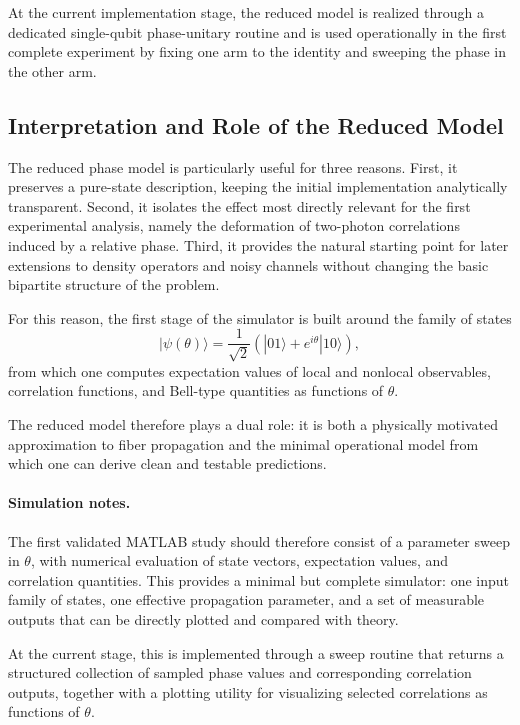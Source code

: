 \documentclass[a4paper]{article}
\begin{document}
At the current implementation stage, the reduced model is realized through a dedicated single-qubit phase-unitary routine and is used operationally in the first complete experiment by fixing one arm to the identity and sweeping the phase in the other arm.


\subsection{Interpretation and Role of the Reduced Model}

The reduced phase model is particularly useful for three reasons. First, it preserves a pure-state description, keeping the initial implementation analytically transparent. Second, it isolates the effect most directly relevant for the first experimental analysis, namely the deformation of two-photon correlations induced by a relative phase. Third, it provides the natural starting point for later extensions to density operators and noisy channels without changing the basic bipartite structure of the problem.

For this reason, the first stage of the simulator is built around the family of states
\[
|\psi(\theta)\rangle
=
\frac{1}{\sqrt{2}}
\left(
|01\rangle + e^{i\theta}|10\rangle
\right),
\]
from which one computes expectation values of local and nonlocal observables, correlation functions, and Bell-type quantities as functions of \(\theta\).

The reduced model therefore plays a dual role: it is both a physically motivated approximation to fiber propagation and the minimal operational model from which one can derive clean and testable predictions.

\paragraph{Simulation notes.}
The first validated MATLAB study should therefore consist of a parameter sweep in \(\theta\), with numerical evaluation of state vectors, expectation values, and correlation quantities. This provides a minimal but complete simulator: one input family of states, one effective propagation parameter, and a set of measurable outputs that can be directly plotted and compared with theory.

At the current stage, this is implemented through a sweep routine that returns a structured collection of sampled phase values and corresponding correlation outputs, together with a plotting utility for visualizing selected correlations as functions of \(\theta\).
\end{document}
